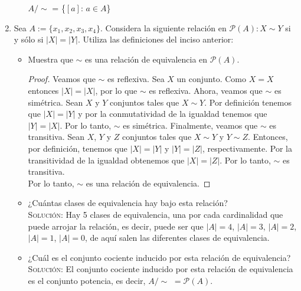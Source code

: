 \documentclass[letterpaper,11pt]{article}
\begin{document}
\begin{enumerate}
\begin{itemize}
            \begin{center}
                $A/\sim$ = \{$[a]$: $a \in A$\}
            \end{center}
        
        \end{itemize}
        
        \item Sea $A := \{x_{1}, x_{2}, x_{3}, x_{4}\}$. Considera la siguiente
        relación en $\mathcal{P}(A): X \sim Y$ si y sólo si $|X| = |Y|$. Utiliza
        las definiciones del inciso anterior:
        
        \begin{itemize}
            
            \item Muestra que $\sim$ es una relación de equivalencia en
            $\mathcal{P}(A)$.
            \begin{proof}
                Veamos que $\sim$ es reflexiva. Sea $X$ un conjunto. Como 
                $X = X$ entonces $|X| = |X|$, por lo que $\sim$ es reflexiva. 
                Ahora, veamos que $\sim$ es simétrica. Sean $X$ y $Y$ conjuntos
                tales que $X \sim Y$. Por definición tenemos que $|X| = |Y|$ y
                por la conmutatividad de la igualdad tenemos que $|Y| = |X|$.
                Por lo tanto, $\sim$ es simétrica. Finalmente, veamos que 
                $\sim$ es transitiva. Sean $X$, $Y$ y $Z$ conjuntos tales que 
                $X \sim Y$ y $Y \sim Z$. Entonces, por definición, tenemos 
                que $|X| = |Y|$ y $|Y| = |Z|$, respectivamente. Por la 
                transitividad de la igualdad obtenemos que $|X| = |Z|$. Por lo
                tanto, $\sim$ es transitiva. \\
                Por lo tanto, $\sim$ es una relación de equivalencia.
            \end{proof}
            
            \item ¿Cuántas clases de equivalencia hay bajo esta relación? \\
            \textsc{Solución:} Hay 5 clases de equivalencia, una por cada
            cardinalidad que puede arrojar la relación, es decir, puede ser que
            $|A| = 4$, $|A| = 3$, $|A| = 2$, $|A| = 1$, $|A| = 0$, de aquí 
            salen las diferentes clases de equivalencia.
            
            \item ¿Cuál es el conjunto cociente inducido por esta relación de
            equivalencia? \\ 
            \textsc{Solución:} El conjunto cociente inducido por esta relación
            de equivalencia es el conjunto potencia, es decir, 
            $A/\sim $ $ = \mathcal{P}(A)$.
        

\end{itemize}
\end{enumerate}
\end{document}
